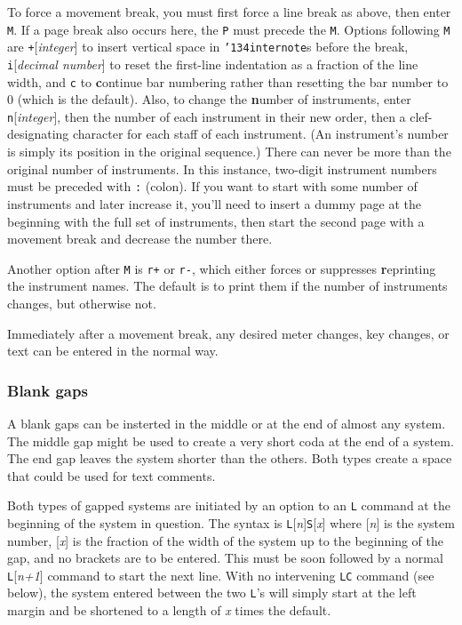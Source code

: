 \documentclass[11pt]{article}
\def\bs{{\tt\char'134}}
\def\newfrom{2.59}  %
\def\NEW#1{\ifdim#1 pt<\newfrom pt\else%
\marginpar{\fbox{#1}}\fi}
\begin{document}
        To force a movement break, you must first force a line break as above,
then enter {\tt M}.  If a page break also occurs here, the {\tt P} must precede 
the {\tt M}.  Options following {\tt M} are {\tt +}[{\it integer}] to insert
vertical space in \bs{\tt internote}s before the break, 
{\tt i}[{\it decimal number}] to reset the first-line indentation as a fraction
of the line width, and {\tt c}\NEW{1.41} to {\bf c}ontinue bar numbering rather 
than resetting the bar number to 0 (which is the default). \NEW{1.4}Also, to 
change the {\bf n}umber of instruments, 
enter {\tt n}[{\it integer}], then the number of each instrument in their new
order, then a clef-designating character for each staff of each instrument.   
(An instrument's number is simply its position in the original sequence.)
There can never be more than the original number of instruments. In this 
instance, \NEW{2.5}two-digit instrument numbers must be preceded with 
{\tt :} (colon). If you want to start with some number of instruments and 
later increase it, you'll need to insert
a dummy page at the beginning with the full set of instruments, then start the 
second page with a movement break and decrease the number there. 

Another\NEW{1.4} option after {\tt M} is {\tt r+} or {\tt r-}, which either 
forces or 
suppresses {\bf r}eprinting the instrument names.  The default is to print 
them if the number of instruments changes, but otherwise not.

      Immediately after a movement break, any desired meter changes, 
key changes, or text can be entered in the normal way.

\subsubsection{Blank gaps} \label{Gaps}

A blank gaps can be insterted in the middle or at the end of almost any system. 
The middle gap might be used to create a very short coda at the end of a 
system. The end gap leaves the system shorter than the others. Both types 
create a space that could be used for text comments.

Both types of gapped systems are initiated by an option to an {\tt L} command at
the beginning of the system in question. The syntax is 
{\tt L}[{\it n}]{\tt S}[{\it x}] where [{\it n}] is the system number, 
[{\it x}] is the fraction of the width of the system up to the beginning of the
gap, and no brackets are to be entered. This must be soon followed by a normal
{\tt L}[{\it n+1}] command to start the next line. With no intervening {\tt LC}
command (see below), the system entered between the two {\tt L}'s will simply
start at the left margin and be shortened to a length of {\it x} times the 
default.
\end{document}
